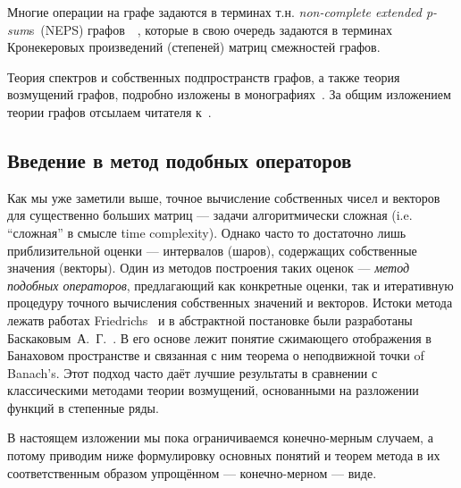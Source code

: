\documentclass[14pt,a4paper]{extarticle}
\theoremstyle{definition}
\begin{document}
Многие операции на графе задаются в терминах т.н.
    \emph{non-complete extended p-sum}s~(NEPS)
    графов~\cite[p.~44]{cvetkovic2010introduction}~\cite{cvetkovic1997eigenspaces},
    которые в свою очередь задаются в терминах Кронекеровых произве\-де\-ний (степеней) матриц
    смежностей графов.

Теория спектров и собственных подпространств графов,
    а также теория возмущений графов, подробно изложены в
    монографиях~\cite{cvetkovic1997eigenspaces,cvetkovic1980spectra,cvetkovic2010introduction}.
    За общим изложением теории графов отсылаем читателя к~\cite{godsil2013algebraic}.


\subsection{Введение в метод подобных операторов}

Как мы уже заметили выше, точное вычисление собствен\-ных чисел и векторов
для сущ\-ествен\-но больших матриц --- задачи алгоритмически сложная (i.e. ``сложная'' в
смысле time complexity). Однако часто то достаточно лишь при\-близ\-ительной оценки
--- интер\-валов (шаров), со\-держ\-ащих собствен\-ные зна\-чения (векторы).
Один из методов построения таких оценок ---
\emph{метод подобных операторов}, предлагающий как кон\-крет\-ные оценки, так и
итеративную процедуру точного вычисления собственных значений и векторов.
Истоки метода лежатв работах Fried\-richs~\cite{friedrichs1965advanced} и в
абстрактной постановке были разработаны
Баскак\-овым~А.~Г.~\cite{baskakov1986theorem,baskakov1987theorem,baskakov1994spectral,baskakov2002splitting}.
В его основе лежит понятие сжимающего отображения в Банаховом пространстве
и связанная с ним теорема о неподвижной точки of Banach's.
Этот подход часто даёт лучшие результаты в сравнении с клас\-сич\-еск\-ими методами
теории возмущений, основанными на разложе\-нии функций в степенные ряды.

В настоящем изложении мы пока ограни\-чиваемся конечно-мерным случаем, а потому
приводим ниже формулировку основных понятий и теорем метода в их соответственным
образом упрощённом --- конечно-мерном --- виде.
\end{document}

